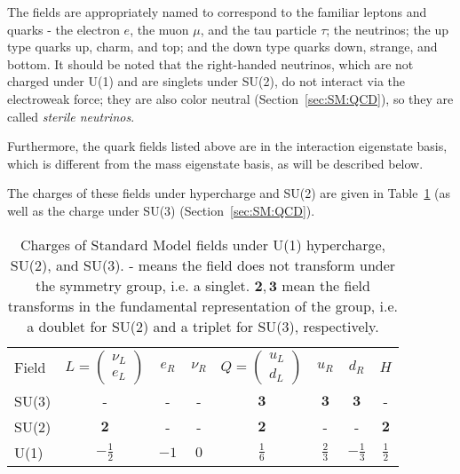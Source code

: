 The fields are appropriately named to correspond to the familiar leptons and quarks - the electron $e$, the muon $\mu$, and the tau particle $\tau$; the neutrinos; the up type quarks up, charm, and top; and the down type quarks down, strange, and bottom.
It should be noted that the right-handed neutrinos, which are not charged under U(1) and are singlets under SU(2), do not interact via the electroweak force; they are also color neutral (Section~\ref{sec:SM:QCD}), so they are called \textit{sterile neutrinos}.

Furthermore, the quark fields listed above are in the interaction eigenstate basis, which is different from the mass eigenstate basis, as will be described below.

The charges of these fields under hypercharge and SU(2) are given in Table~\ref{tab:SM:charges} (as well as the charge under SU(3) (Section~\ref{sec:SM:QCD}).
\begin{table}[]
\centering
\caption{Charges of Standard Model fields under U(1) hypercharge, SU(2), and SU(3). - means the field does not transform under the symmetry group, i.e. a singlet. $\mathbf{2},\mathbf{3}$ mean the field transforms in the fundamental representation of the group, i.e. a doublet for SU(2) and a triplet for SU(3), respectively.}
\label{tab:SM:charges}
\begin{tabular}{l c c c c c c c}
\hline
Field  & $L = \begin{pmatrix}\nu_L\\e_L\end{pmatrix}$  & $e_R$  & $\nu_R$ & $Q = \begin{pmatrix}u_L\\d_L\end{pmatrix}$ & $u_R$ & $d_R$ & $H$ \\
SU(3) & - & - & - & $\mathbf{3}$ & $\mathbf{3}$ & $\mathbf{3}$ & - \\
SU(2) & $\mathbf{2}$ & - & - & $\mathbf{2}$ & - & - & $\mathbf{2}$ \\
U(1)  & $-\frac{1}{2}$ & $-1$ & $0$ & $\frac{1}{6}$ & $\frac{2}{3}$ & $-\frac{1}{3}$ & $\frac{1}{2}$
\end{tabular}
\end{table}

